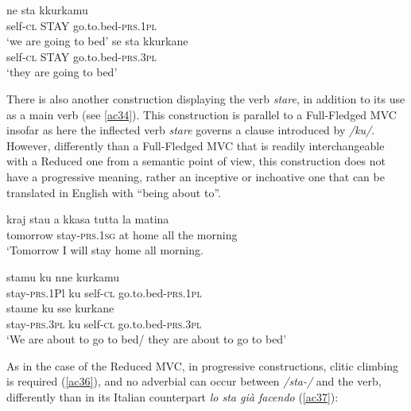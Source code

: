 \documentclass[output=paper]{langscibook}
\begin{document}
\ea\label{ac33}
    \ea\label{ac33a} \gll  ne   sta   kkurkamu \\
    self-\textsc{cl}  STAY   go.to.bed-\textsc{prs}.\textsc{1pl}\\
  \glt ‘we are going to bed’
    \ex\label{ac33b} \gll se    sta   kkurkane\\
   self-\textsc{cl}  STAY go.to.bed-\textsc{prs}.\textsc{3pl}\\
     \glt ‘they are going to bed’
 \z
\z

There is also another construction displaying the verb \textit{stare}, in addition to its use as a main verb (see \ref{ac34}). This construction is parallel to a Full-Fledged MVC insofar as here the inflected verb \textit{stare} governs a clause introduced by \textit{/ku/}. However, differently than a Full-Fledged MVC that is readily interchangeable with a Reduced one from a semantic point of view, this construction does not have a progressive meaning, rather an inceptive or inchoative one that can be translated in English with “being about to”.

\ea \label{ac34}\gll kraj      stau       a  kkasa  tutta  la  matina\\
    tomorrow   stay-\textsc{prs}.\textsc{1sg} at home all   the  morning\\
 \glt ‘Tomorrow I will stay home all morning.
\z

\ea\label{ac35}
    \ea \label{ac35a}\gll stamu      ku  nne     kurkamu\\
    stay-\textsc{prs}.1Pl ku self-\textsc{cl}  go.to.bed-\textsc{prs}.\textsc{1pl}\\
    \ex \label{ac35b}\gll staune      ku  sse     kurkane\\
    stay-\textsc{prs}.\textsc{3pl} ku self-\textsc{cl}  go.to.bed-\textsc{prs}.\textsc{3pl}\\
    \glt ‘We are about to go to bed/ they are about to go to bed’
    \z
\z

As in the case of the Reduced MVC, in progressive constructions, clitic climbing is required (\ref{ac36}), and no adverbial can occur between \textit{/sta-/} and the verb, differently than in its Italian counterpart \textit{lo sta già facendo} (\ref{ac37}):

\ea\label{ac36}
    \z
\z
\end{document}

